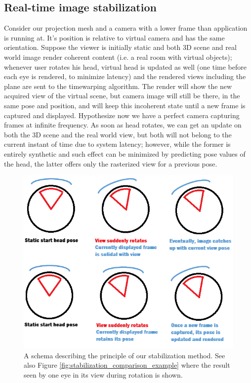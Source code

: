 \subsection{Real-time image stabilization}
Consider our projection mesh and a camera with a lower frame than application is running at. It's position is relative to virtual camera and has the same orientation. Suppose the viewer is initially static and both 3D scene and real world image render coherent content (i.e. a real room with virtual objects); whenever user rotates his head, virtual head is updated as well (one time before each eye is rendered, to minimize latency) and the rendered views including the plane are sent to the timewarping algorithm. The render will show the new acquired view of the virtual scene, but camera image will still be there, in the same pose and position, and will keep this incoherent state until a new frame is captured and displayed. Hypothesize now we have a perfect camera capturing frames at infinite frequency. As soon as head rotates, we can get an update on both the 3D scene and the real world view, but both will not belong to the current instant of time due to system latency; however, while the former is entirely synthetic and such effect can be minimized by predicting pose values of the head, the latter offers only the rasterized view for a previous pose.

\begin{figure}
\centering
\includegraphics[width=0.7\linewidth]{schemas/stabilization_comparison_schema}
\caption{A schema describing the principle of our stabilization method. See also Figure \ref{fig:stabilization_comparison_example} where the result seen by one eye in its view during rotation is shown.}
\label{fig:stabilization_comparison_schema}
\end{figure}


